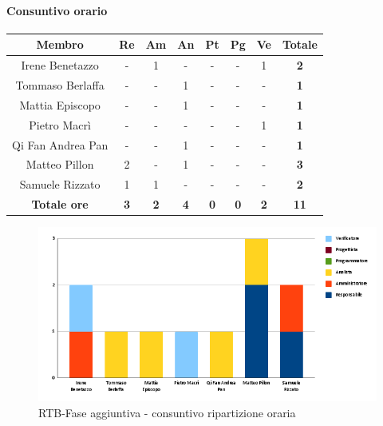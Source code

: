\paragraph{Consuntivo orario}
\begin{center}
	\renewcommand{\arraystretch}{1.8}
	\begin{tabular}{ |c|c|c|c|c|c|c|c| }
	\hline
	\textbf{Membro} & \textbf{Re} & \textbf{Am} &  \textbf{An} &  \textbf{Pt} &  \textbf{Pg} &  \textbf{Ve} &  \textbf{Totale}\\
    \hline
    Irene Benetazzo   & - & 1 & - & - & - & 1 & \textbf{2} \\
    \hline
    Tommaso Berlaffa  & - & - & 1 & - & - & - & \textbf{1} \\
    \hline
    Mattia Episcopo   & - & - & 1 & - & - & - & \textbf{1} \\
    \hline
    Pietro Macrì      & - & - & - & - & - & 1 & \textbf{1} \\
    \hline
    Qi Fan Andrea Pan & - & - & 1 & - & - & - & \textbf{1} \\
    \hline
    Matteo Pillon     & 2 & - & 1 & - & - & - & \textbf{3} \\
    \hline
    Samuele Rizzato   & 1 & 1 & - & - & - & - & \textbf{2} \\
    \hline
    \textbf{Totale ore} & \textbf{3} & \textbf{2} &  \textbf{4} &  \textbf{0} &  \textbf{0} &  \textbf{2} &  \textbf{11}\\
    \hline
	\end{tabular}
\end{center}

\begin{figure}[H]
    \centering\includegraphics[width=\textwidth, height=\textheight,keepaspectratio]{images/consuntivo/RTB-fase-aggiuntiva-ore.png}
    \caption{RTB-Fase aggiuntiva - consuntivo ripartizione oraria}
\end{figure}

